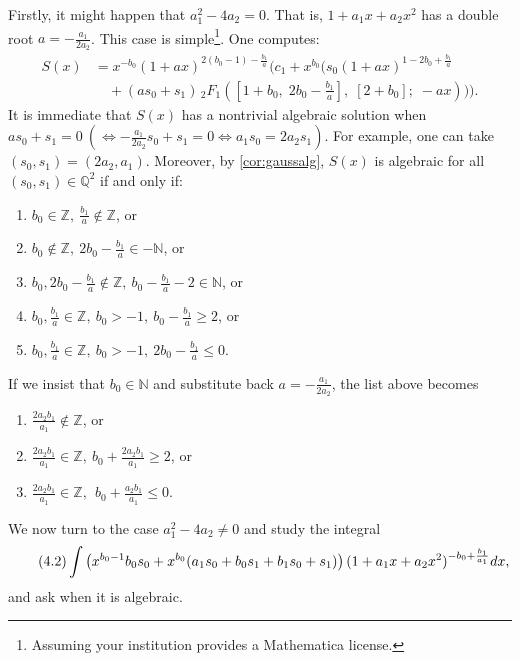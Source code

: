 \documentclass[11pt]{article}
\theoremstyle{definition}
\theoremstyle{plain}
\theoremstyle{remark}
\begin{document}
Firstly, it might happen that $a_1^2-4a_2 = 0$. That is, $1+a_1x+a_2x^2$ has a double root $a = -\frac{a_1}{2a_2}$. This case is simple\footnote{Assuming your institution provides a Mathematica license.}. One computes:
\begin{align*}
S(x) &= x^{-b_0} (1 + a x)^{2(b_0 - 1) - \frac{b_1}{a}} \bigg( 
  c_1 + x^{b_0} \bigg( 
    s_0 (1 + a x)^{1 - 2b_0 + \frac{b_1}{a}} \\
    &\quad + (a s_0 + s_1) \, {}_2F_1\left(
      [1 + b_0,\;
      2b_0 - \frac{b_1}{a}],\;
      [2 + b_0];\;
      -a x
    \right) 
  \bigg) 
\bigg).
\end{align*}
It is immediate that $S(x)$ has a nontrivial algebraic solution when $as_0+s_1=0 \ (\iff -\frac{a_1}{2a_2}s_0+s_1=0 \iff a_1s_0=2a_2s_1)$. For example, one can take $(s_0,s_1) = (2a_2, a_1)$. Moreover, by \cref{cor:gaussalg},
$S(x)$ is algebraic for all $(s_0,s_1) \in \mathbb{Q}^2$ if and only if:
\begin{enumerate}
  \item $b_0\in\mathbb Z,\ \frac{b_1}{a}\notin\mathbb Z$, or 
  \item $b_0\notin\mathbb Z,\ 2b_0-\frac{b_1}{a}\in-\mathbb N$, or 
  \item $b_0,2b_0-\frac{b_1}{a}\notin\mathbb Z,\ b_0-\frac{b_1}{a}-2\in\mathbb N$, or 
  \item $b_0,\frac{b_1}{a}\in\mathbb Z,\ b_0>-1,\ b_0-\frac{b_1}{a}\ge 2$, or
  \item $b_0,\frac{b_1}{a}\in\mathbb Z,\  b_0>-1, \ 2b_0-\frac{b_1}{a}\le 0$.
\end{enumerate}
If we insist that $b_0\in\mathbb{N}$ and substitute back $a = -\frac{a_1}{2a_2}$, the list above becomes
\begin{enumerate}
  \item $\frac{2a_2b_1}{a_1}\notin\mathbb Z$, or 
  \item $\frac{2a_2b_1}{a_1}\in\mathbb Z,\ b_0+\frac{2a_2b_1}{a_1}\ge 2$, or
  \item $\frac{2a_2b_1}{a_1}\in\mathbb Z,\ \ b_0 +\frac{a_2b_1}{a_1} \le 0$.
\end{enumerate}

We now turn to the case $a_1^2-4a_2 \neq 0$ and study the integral
\begin{equation}\label{eq:{4.2}}\tag{4.2}
\int{\left(x^{b_0-1}b_0s_0 + x^{b_0}(a_1s_0+b_0s_1+b_1s_0+s_1)\right)(1+a_1x+a_2x^2)^{-b_0+\frac{b_1}{a_1}}dx},
\end{equation}
and ask when it is algebraic. 
\end{document}
